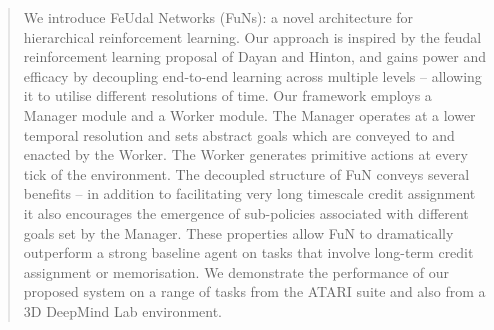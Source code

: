 \begin{abstract}

We introduce FeUdal Networks (FuNs): a novel architecture for hierarchical reinforcement learning.
Our approach is inspired by the feudal reinforcement learning proposal of Dayan and Hinton, and gains power and efficacy by decoupling end-to-end learning across multiple levels -- allowing it to utilise different resolutions of time.
Our framework employs a Manager module and a Worker module. %
The Manager operates at a lower temporal resolution and sets abstract goals which are conveyed to and enacted by the Worker. The Worker generates primitive actions at every tick of the environment.
The decoupled structure of FuN conveys several benefits -- in addition to facilitating very long timescale credit assignment it also encourages the emergence of sub-policies associated with different goals set by the Manager. 
These properties allow FuN to dramatically outperform a strong baseline agent on tasks that involve long-term credit assignment or memorisation.
We demonstrate the performance of our proposed system on a range of tasks from the ATARI suite and also from a 3D DeepMind Lab environment.

\end{abstract}